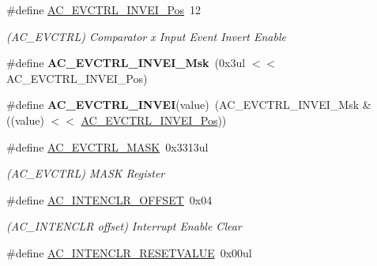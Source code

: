 \begin{DoxyCompactItemize}
\item 
\hypertarget{group___s_a_m_l21___a_c_ga59a28973d23bf2b2c04b3a9b6897674d}{}\#define \hyperlink{group___s_a_m_l21___a_c_ga59a28973d23bf2b2c04b3a9b6897674d}{A\+C\+\_\+\+E\+V\+C\+T\+R\+L\+\_\+\+I\+N\+V\+E\+I\+\_\+\+Pos}~12\label{group___s_a_m_l21___a_c_ga59a28973d23bf2b2c04b3a9b6897674d}

\begin{DoxyCompactList}\small\item\em (A\+C\+\_\+\+E\+V\+C\+T\+R\+L) Comparator x Input Event Invert Enable \end{DoxyCompactList}\item 
\hypertarget{group___s_a_m_l21___a_c_ga9188751d2d1db21822ba03c2c0c3d80a}{}\#define {\bfseries A\+C\+\_\+\+E\+V\+C\+T\+R\+L\+\_\+\+I\+N\+V\+E\+I\+\_\+\+Msk}~(0x3ul $<$$<$ A\+C\+\_\+\+E\+V\+C\+T\+R\+L\+\_\+\+I\+N\+V\+E\+I\+\_\+\+Pos)\label{group___s_a_m_l21___a_c_ga9188751d2d1db21822ba03c2c0c3d80a}

\item 
\hypertarget{group___s_a_m_l21___a_c_gad48b061a27cf85860598dfd5fe2b0f00}{}\#define {\bfseries A\+C\+\_\+\+E\+V\+C\+T\+R\+L\+\_\+\+I\+N\+V\+E\+I}(value)~(A\+C\+\_\+\+E\+V\+C\+T\+R\+L\+\_\+\+I\+N\+V\+E\+I\+\_\+\+Msk \& ((value) $<$$<$ \hyperlink{group___s_a_m_l21___a_c_ga59a28973d23bf2b2c04b3a9b6897674d}{A\+C\+\_\+\+E\+V\+C\+T\+R\+L\+\_\+\+I\+N\+V\+E\+I\+\_\+\+Pos}))\label{group___s_a_m_l21___a_c_gad48b061a27cf85860598dfd5fe2b0f00}

\item 
\hypertarget{group___s_a_m_l21___a_c_ga6cdb3ec1006044a008363289c16bb6a5}{}\#define \hyperlink{group___s_a_m_l21___a_c_ga6cdb3ec1006044a008363289c16bb6a5}{A\+C\+\_\+\+E\+V\+C\+T\+R\+L\+\_\+\+M\+A\+S\+K}~0x3313ul\label{group___s_a_m_l21___a_c_ga6cdb3ec1006044a008363289c16bb6a5}

\begin{DoxyCompactList}\small\item\em (A\+C\+\_\+\+E\+V\+C\+T\+R\+L) M\+A\+S\+K Register \end{DoxyCompactList}\item 
\hypertarget{group___s_a_m_l21___a_c_gad6b968b57c8516a8820878fd349e0d3c}{}\#define \hyperlink{group___s_a_m_l21___a_c_gad6b968b57c8516a8820878fd349e0d3c}{A\+C\+\_\+\+I\+N\+T\+E\+N\+C\+L\+R\+\_\+\+O\+F\+F\+S\+E\+T}~0x04\label{group___s_a_m_l21___a_c_gad6b968b57c8516a8820878fd349e0d3c}

\begin{DoxyCompactList}\small\item\em (A\+C\+\_\+\+I\+N\+T\+E\+N\+C\+L\+R offset) Interrupt Enable Clear \end{DoxyCompactList}\item 
\hypertarget{group___s_a_m_l21___a_c_gaa39f9b02199c37ef041fc8e0d31e231d}{}\#define \hyperlink{group___s_a_m_l21___a_c_gaa39f9b02199c37ef041fc8e0d31e231d}{A\+C\+\_\+\+I\+N\+T\+E\+N\+C\+L\+R\+\_\+\+R\+E\+S\+E\+T\+V\+A\+L\+U\+E}~0x00ul\label{group___s_a_m_l21___a_c_gaa39f9b02199c37ef041fc8e0d31e231d}


\end{DoxyCompactItemize}

